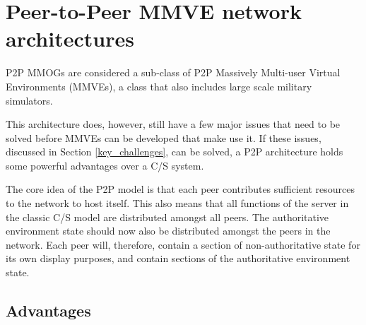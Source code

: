\section{Peer-to-Peer MMVE network architectures}
\label{p2p_network_architectures}

P2P MMOGs are considered a sub-class of P2P Massively Multi-user Virtual Environments (MMVEs), a class that also includes large scale military simulators.

This architecture does, however, still have a few major issues that need to be solved before MMVEs can be developed that make use it. If these issues, discussed in Section \ref{key_challenges}, can be solved, a P2P architecture holds some powerful advantages over a C/S system.

The core idea of the P2P model is that each peer contributes sufficient resources to the network to host itself. This also means that all functions of the server in the classic C/S model are distributed amongst all peers. The authoritative environment state should now also be distributed amongst the peers in the network. Each peer will, therefore, contain a section of non-authoritative state for its own display purposes, and contain sections of the authoritative environment state.

\subsection{Advantages}
\label{p2p_mmve_advantages}

